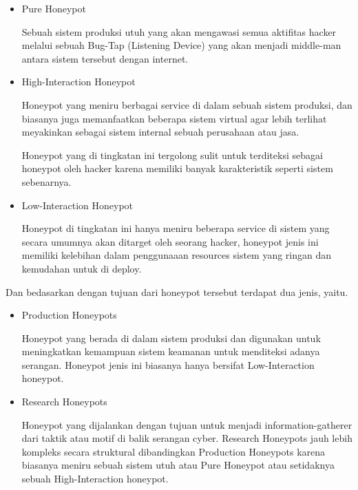 \documentclass[12pt, a4paper]{article}
\begin{document}
    \begin{itemize}
      \item Pure Honeypot

        Sebuah sistem produksi utuh yang akan mengawasi semua aktifitas hacker
        melalui sebuah Bug-Tap (Listening Device) yang akan menjadi middle-man
        antara sistem tersebut dengan internet.

      \item High-Interaction Honeypot

        Honeypot yang meniru berbagai service di dalam sebuah sistem produksi,
        dan biasanya juga memanfaatkan beberapa sistem virtual agar lebih
        terlihat meyakinkan sebagai sistem internal sebuah perusahaan atau jasa.

        Honeypot yang di tingkatan ini tergolong sulit untuk terditeksi
        sebagai honeypot oleh hacker karena memiliki banyak karakteristik
        seperti sistem sebenarnya.

      \item Low-Interaction Honeypot

        Honeypot di tingkatan ini hanya meniru beberapa service di sistem yang
        secara umumnya akan ditarget oleh seorang hacker, honeypot jenis ini
        memiliki kelebihan dalam penggunaaan resources sistem yang ringan dan
        kemudahan untuk di deploy.

    \end{itemize}

    Dan bedasarkan dengan tujuan dari honeypot tersebut terdapat dua jenis, yaitu.

    \begin{itemize}

      \item Production Honeypots

        Honeypot yang berada di dalam sistem produksi dan digunakan untuk meningkatkan
        kemampuan sistem keamanan untuk menditeksi adanya serangan. Honeypot jenis
        ini biasanya hanya bersifat Low-Interaction honeypot.

      \item Research Honeypots

        Honeypot yang dijalankan dengan tujuan untuk menjadi information-gatherer
        dari taktik atau motif di balik serangan cyber. Research Honeypots jauh lebih
        kompleks secara struktural dibandingkan Production Honeypots karena biasanya
        meniru sebuah sistem utuh atau Pure Honeypot atau setidaknya sebuah
        High-Interaction honeypot.

    \end{itemize}
\end{document}
